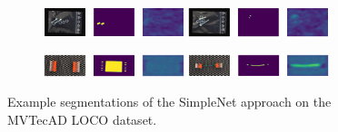 \begin{figure}[H]
\begin{subfigure}[b]{\textwidth}
    \end{subfigure}
    \begin{subfigure}[b]{\textwidth}
        \centering
        \includegraphics[width=0.45\textwidth]{figures/appendix/appendix_simplenet/SB/image_prediction_150.png}
        \hfill
        \includegraphics[width=0.45\textwidth]{figures/appendix/appendix_simplenet/SB/image_prediction_311.png}

    \end{subfigure}
    \begin{subfigure}[b]{\textwidth}
        \centering
        \includegraphics[width=0.45\textwidth]{figures/appendix/appendix_simplenet/SC/image_prediction_140.png}
        \hfill
        \includegraphics[width=0.45\textwidth]{figures/appendix/appendix_simplenet/SC/image_prediction_298.png}

    \end{subfigure}
    
    \caption{Example segmentations of the SimpleNet \cite{liu2023simplenet} approach on the MVTecAD LOCO \cite{LOCODentsAndScratchesBergmann2022} dataset.}
    \label{fig:appendixSimplenet}
\end{figure}